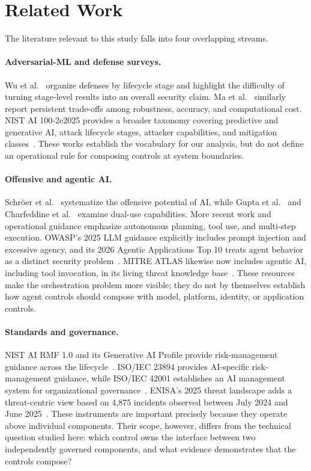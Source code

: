 \documentclass[runningheads]{llncs}
\begin{document}
\section{Related Work}

The literature relevant to this study falls into four overlapping streams.

\paragraph{Adversarial-ML and defense surveys.}
Wu et al.~\cite{wu2025defenses} organize defenses by lifecycle stage and highlight the difficulty of turning stage-level results into an overall security claim. Ma et al.~\cite{ma2026advancements} similarly report persistent trade-offs among robustness, accuracy, and computational cost. NIST AI 100-2e2025 provides a broader taxonomy covering predictive and generative AI, attack lifecycle stages, attacker capabilities, and mitigation classes~\cite{nist2025aml}. These works establish the vocabulary for our analysis, but do not define an operational rule for composing controls at system boundaries.

\paragraph{Offensive and agentic AI.}
Schr\"oer et al.~\cite{schroer2025offensive} systematize the offensive potential of AI, while Gupta et al.~\cite{gupta2023threatgpt} and Charfeddine et al.~\cite{charfeddine2024chatgpt} examine dual-use capabilities. More recent work and operational guidance emphasize autonomous planning, tool use, and multi-step execution. OWASP's 2025 LLM guidance explicitly includes prompt injection and excessive agency, and its 2026 Agentic Applications Top 10 treats agent behavior as a distinct security problem~\cite{owasp2025,owaspagentic2026}. MITRE ATLAS likewise now includes agentic AI, including tool invocation, in its living threat knowledge base~\cite{mitreatlas2026}. These resources make the orchestration problem more visible; they do not by themselves establish how agent controls should compose with model, platform, identity, or application controls.

\paragraph{Standards and governance.}
NIST AI RMF 1.0 and its Generative AI Profile provide risk-management guidance across the lifecycle~\cite{nistrmf2023,nistgaiprofile2024}. ISO/IEC 23894 provides AI-specific risk-management guidance, while ISO/IEC 42001 establishes an AI management system for organizational governance~\cite{iso23894,iso42001}. ENISA's 2025 threat landscape adds a threat-centric view based on 4,875 incidents observed between July 2024 and June 2025~\cite{enisa2025}. These instruments are important precisely because they operate above individual components. Their scope, however, differs from the technical question studied here: which control owns the interface between two independently governed components, and what evidence demonstrates that the controls compose?
\end{document}
